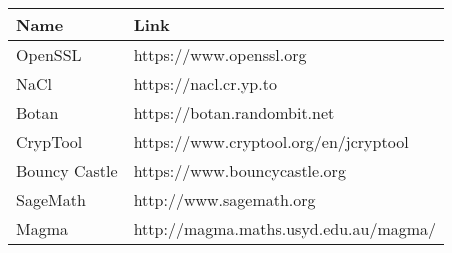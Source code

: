 \documentclass[11pt]{article} %
\begin{document}
\vspace{0.2cm}

\begin{tabular}{ |p{3cm}|p{8cm}|  }
\hline
\textbf{Name} & \textbf{Link} \\
\hline
OpenSSL & https://www.openssl.org \\
\hline
NaCl & https://nacl.cr.yp.to \\
\hline
Botan & https://botan.randombit.net \\
\hline
CrypTool & https://www.cryptool.org/en/jcryptool \\
\hline
Bouncy Castle & https://www.bouncycastle.org \\
\hline
SageMath & http://www.sagemath.org \\
\hline
Magma & http://magma.maths.usyd.edu.au/magma/ \\
\hline
\end{tabular}

%
%
\printbibliography
\end{document}
